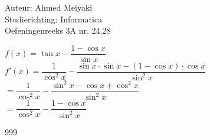 \documentclass[a4paper]{article}
\begin{document}
  
\noindent \large Auteur: Ahmed Meiyaki \\
\noindent \large Studierichting: Informatica\\
\noindent \large Oefeningenreeks 3A nr. 24.28\\

\medskip

\normalsize

$f(x) = \tan x - \dfrac{1 - \cos x}{\sin x} $\\

$f'(x) = \dfrac{1}{\cos^2x} - \dfrac{\sin x \cdot \sin x - \left(1 - \cos x\right) \cdot \cos x}{\sin^2x} $\\

$= \dfrac{1}{\cos^2x} - \dfrac{\sin^2x - \cos x + \cos^2x}{\sin^2x} $\\

$= \dfrac{1}{\cos^2x} - \dfrac{1 - \cos x}{\sin^2x} $\\













\begin{thebibliography}{999}
\end{thebibliography}
\end{document}
